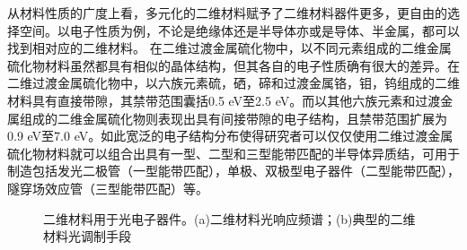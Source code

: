     从材料性质的广度上看，多元化的二维材料赋予了二维材料器件更多，更自由的选择空间。以电子性质为例，不论是绝缘体还是半导体亦或是导体、半金属，都可以找到相对应的二维材料。
    在二维过渡金属硫化物中，以不同元素组成的二维金属硫化物材料虽然都具有相似的晶体结构，但其各自的电子性质确有很大的差异。在二维过渡金属硫化物中，以六族元素硫，硒，碲和过渡金属铬，钼，钨组成的二维材料具有直接带隙，其禁带范围囊括0.5 eV至2.5 eV。而以其他六族元素和过渡金属组成的二维金属硫化物则表现出具有间接带隙的电子结构，且禁带范围扩展为0.9 eV至7.0 eV。如此宽泛的电子结构分布使得研究者可以仅仅使用二维过渡金属硫化物材料就可以组合出具有一型、二型和三型能带匹配的半导体异质结，可用于制造包括发光二极管（一型能带匹配），单极、双极型电子器件（二型能带匹配），隧穿场效应管（三型能带匹配）等。

    \begin{figure}[htb]
        \caption{二维材料用于光电子器件。(a)二维材料光响应频谱；(b)典型的二维材料光调制手段}
        \label{}
    \end{figure}

